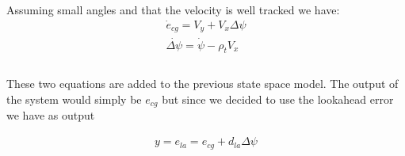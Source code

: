 \documentclass{report}
\begin{document}
Assuming small angles and that the velocity is well tracked we have:
\begin{equation}
\begin{aligned}
\dot{e}_{cg} = V_y + V_x \Delta\psi\\
\dot{\Delta\psi} = \dot{\psi} - \rho_t V_x\\\\
\end{aligned}    
\end{equation}

These two equations are added to the previous state space model. The output of the system would simply be $e_{cg}$ but since we decided to use the lookahead error we have as output

\begin{equation}
\begin{aligned}
y = e_{la} = e_{cg} + d_{la} \Delta\psi
\end{aligned}    
\end{equation}
\end{document}
